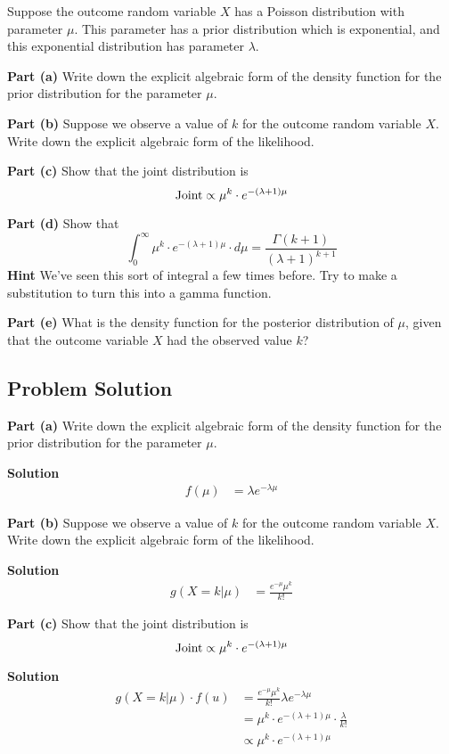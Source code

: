 \documentclass[12pt]{article}
\theoremstyle{definition}
\begin{document}
Suppose the outcome random variable $X$ has a Poisson distribution with parameter $\mu$. This parameter has a prior distribution which is exponential, and this exponential distribution has parameter $\lambda$.

\bigskip
\noindent
{\bf Part (a)} Write down the explicit algebraic form of the density function for the prior distribution for the parameter $\mu$.

\bigskip
\noindent
{\bf Part (b)} Suppose we observe a value of $k$ for the outcome random variable $X$. Write down the explicit algebraic form of the likelihood.

\bigskip
\noindent
{\bf Part (c)} Show that the joint distribution is
$$
\hbox{Joint} \propto \mu^k \cdot e^{-(\lambda + 1) \mu}
$$

\bigskip
\noindent
{\bf Part (d)} Show that
$$
\int_0^\infty \mu^{k} \cdot e^{-(\lambda+1) \mu} \cdot d\mu = \frac{ \Gamma( k + 1 ) }{(\lambda + 1)^{k+1} }
$$
\noindent
{\bf Hint} We've seen this sort of integral a few times before. Try to make a substitution to turn this into a gamma function.

\bigskip
\noindent
{\bf Part (e)} What is the density function for the posterior distribution of $\mu$, given that the outcome variable $X$ had the observed value $k$?


\newpage
\subsection*{Problem Solution}

\noindent
{\bf Part (a)} Write down the explicit algebraic form of the density function for the prior distribution for the parameter $\mu$.

\bigskip
\noindent
{\bf Solution}
\begin{align*}
f(\mu) &= \lambda e^{-\lambda\mu}
\end{align*}


\noindent
{\bf Part (b)} Suppose we observe a value of $k$ for the outcome random variable $X$. Write down the explicit algebraic form of the likelihood.

\bigskip
\noindent
{\bf Solution}
\begin{align*}
g(X=k|\mu) &= \frac{e^{-\mu}\mu^k}{k!}
\end{align*}

\noindent
{\bf Part (c)} Show that the joint distribution is
$$
\hbox{Joint} \propto \mu^k \cdot e^{-(\lambda + 1) \mu}
$$


\bigskip
\noindent
{\bf Solution}
\begin{align*}
g(X=k|\mu)\cdot f(u) &= \frac{e^{-\mu}\mu^k}{k!} \lambda e^{-\lambda\mu}\\
&= \mu^k \cdot e^{-(\lambda + 1)\mu}\cdot\frac{\lambda}{k!}\\
&\propto \mu^k \cdot e^{-(\lambda + 1)\mu}
\end{align*}
\end{document}
